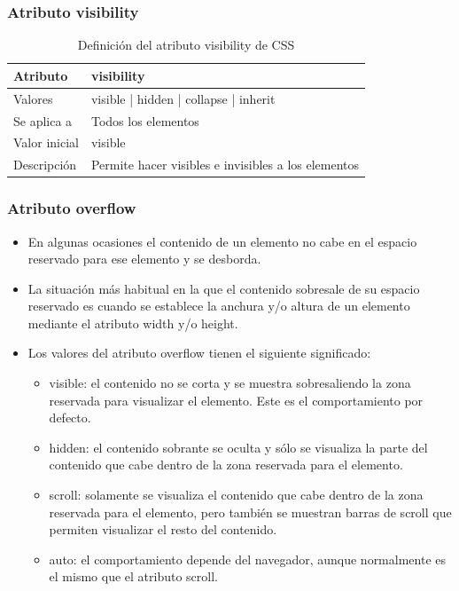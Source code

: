 \documentclass[ucs]{beamer}
\begin{document}

\begin{frame}
\frametitle{Atributo visibility}

\begin{center}
  \begin{table}
   \begin{tabular}{p{1.8cm}p{7.8cm}}
Atributo & \bf{visibility} \\ \hline
Valores& visible | hidden | collapse | inherit \\ \hline
Se aplica a& Todos los elementos \\ \hline
Valor inicial& visible \\ \hline
Descripción& Permite hacer visibles e invisibles a los elementos \\ \hline
  \end{tabular}
   \caption{Definición del atributo visibility de CSS}
 \end{table}
\end{center}


\end{frame}



\begin{frame}
\frametitle{Atributo overflow}

\begin{itemize}
  \item En algunas ocasiones el contenido de un elemento no cabe en el espacio reservado para ese elemento y se desborda.
  \item La situación más habitual en la que el contenido sobresale de su espacio reservado es cuando se establece la anchura y/o altura de un elemento mediante el atributo width y/o height. 
  \item Los valores del atributo overflow tienen el siguiente significado:
  \begin{itemize}
    \item visible: el contenido no se corta y se muestra sobresaliendo la zona reservada para visualizar el elemento. Este es el comportamiento por defecto.
    \item hidden: el contenido sobrante se oculta y sólo se visualiza la parte del contenido que cabe dentro de la zona reservada para el elemento.
    \item scroll: solamente se visualiza el contenido que cabe dentro de la zona reservada para el elemento, pero también se muestran barras de scroll que permiten visualizar el resto del contenido.
    \item auto: el comportamiento depende del navegador, aunque normalmente es el mismo que el atributo scroll.
  \end{itemize}
\end{itemize}

\end{frame}
\end{document}
